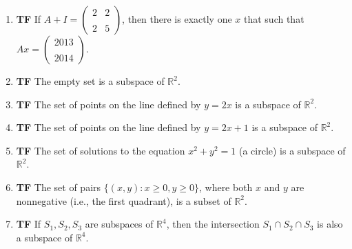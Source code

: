 \documentclass[11pt]{article}
\newcommand{\tf}[1]{\item {\bf {\color{blue}\hspace{1em}T\hspace{1em}F}}\hspace{1em} #1}
\begin{document}
\begin{enumerate}
\tf{If $A+I=\left(\begin{array}{rr}
2 & 2 \\\\
2 & 5
\end{array}\right)$, then there is exactly one $x$ that such that $Ax = \left(\begin{array}{r}2013 \\\\2014\end{array}\right)$.}

\tf{The empty set is a subspace of $\mathbb{R}^2$.}

\tf{The set of points on the line defined by $y = 2x$ is a subspace of $\mathbb{R}^2$.}

\tf{The set of points on the line defined by $y = 2x + 1$ is a subspace of $\mathbb{R}^2$.}

\tf{The set of solutions to the equation $x^2 + y^2 = 1$ (a circle) is a subspace of $\mathbb{R}^2$.}

\tf{The set of pairs $\{(x,y): x\geq 0, y\geq 0\}$, where both $x$ and $y$ are nonnegative (i.e., the first quadrant), is a subset of $\mathbb{R}^2$.}

\tf{If $S_1, S_2, S_3$ are subspaces of $\mathbb{R}^4$, then the intersection $S_1\cap S_2 \cap S_3$ is also a subspace of $\mathbb{R}^4$.}

\end{enumerate}
\end{document}
